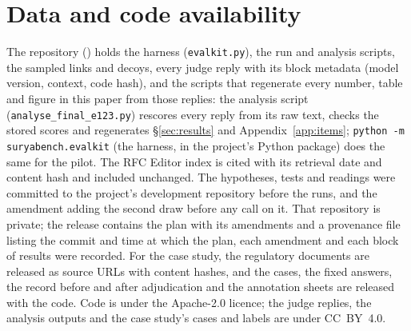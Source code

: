 \section{Data and code availability}
\label{sec:availability}
The repository (\repourl) holds the harness (\texttt{evalkit.py}), the run and analysis scripts, the sampled links and
decoys, every judge reply with its block metadata (model version, context, code hash), and the scripts that regenerate
every number, table and figure in this paper from those replies: the analysis script (\texttt{analyse\_final\_e123.py}) rescores every reply
from its raw text, checks the stored scores and regenerates \S\ref{sec:results} and Appendix~\ref{app:items};
\texttt{python -m suryabench.evalkit} (the harness, in the project's Python package) does the same for the pilot. The RFC Editor index is cited with its retrieval
date and content hash \citep{rfcindex2026} and included unchanged. The hypotheses, tests and readings were committed to
the project's development repository before the runs, and the amendment adding the second draw before any call on it.
That repository is private; the release contains the plan with its amendments and a provenance file listing the commit
and time at which the plan, each amendment and each block of results were recorded. For the case study, the regulatory
documents are released as source URLs with content hashes, and the cases, the fixed answers, the record before and
after adjudication and the annotation sheets are released with the code. Code is under the Apache-2.0 licence; the
judge replies, the analysis outputs and the case study's cases and labels are under CC~BY~4.0.
